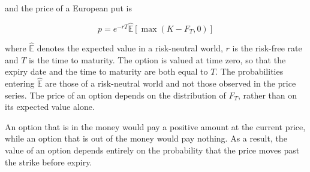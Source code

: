 and the price of a European put is 

\begin{equation}
    p = e^{-r T} \hat{\mathbb{E}}[\max(K - F_T, 0)]
    \label{eq:price-put}
\end{equation}

where $\hat{\mathbb{E}}$ denotes the expected value in a risk-neutral world, $r$ is the risk-free rate and $T$ is the time to maturity. The option is valued at time zero, so that the expiry date and the time to maturity are both equal to $T$. The probabilities entering $\hat{\mathbb{E}}$ are those of a risk-neutral world and not those observed in the price series. The price of an option depends on the distribution of $F_T$, rather than on its expected value alone.

An option that is in the money would pay a positive amount at the current price, while an option that is out of the money would pay nothing. As a result, the value of an option depends entirely on the probability that the price moves past the strike before expiry.